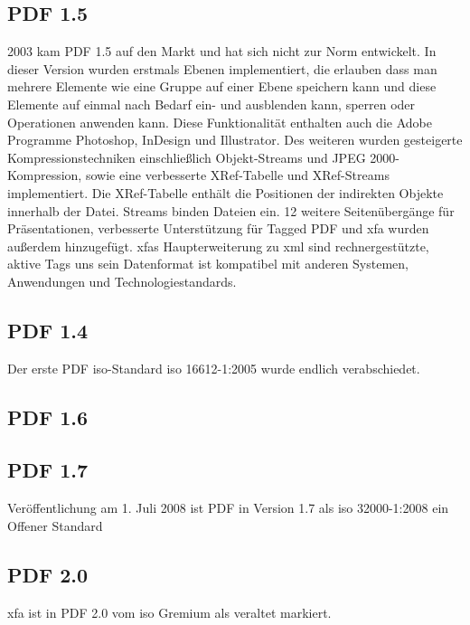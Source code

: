 \subsection{PDF 1.5}
2003 kam PDF 1.5 auf den Markt und hat sich nicht zur Norm entwickelt. In dieser Version wurden erstmals Ebenen implementiert, die erlauben dass man mehrere Elemente wie eine Gruppe auf einer Ebene speichern kann und diese Elemente auf einmal nach Bedarf ein- und ausblenden kann, sperren oder Operationen anwenden kann. Diese Funktionalität enthalten auch die Adobe Programme Photoshop, InDesign und Illustrator. Des weiteren wurden gesteigerte Kompressionstechniken einschließlich Objekt-Streams und JPEG 2000-Kompression, sowie eine verbesserte XRef-Tabelle und XRef-Streams implementiert.
Die XRef-Tabelle enthält die Positionen der indirekten Objekte innerhalb der Datei. Streams binden Dateien ein. 12 weitere Seitenübergänge für Präsentationen, verbesserte Unterstützung für Tagged PDF und \gls{xfa} wurden außerdem hinzugefügt. \cite{proj-consult} \gls{xfa}s Haupterweiterung zu \gls{xml} sind rechnergestützte, aktive Tags uns sein Datenformat ist kompatibel mit anderen Systemen, Anwendungen und Technologiestandards. \cite{wiki-xfa}

\subsection{PDF 1.4}
Der erste PDF \gls{iso}-Standard \gls{iso} 16612-1:2005 wurde endlich verabschiedet.

\subsection{PDF 1.6}

\subsection{PDF 1.7}
Veröffentlichung am 1. Juli 2008 ist PDF in Version 1.7 als \gls{iso} 32000-1:2008 ein Offener Standard

\subsection{PDF 2.0}
\gls{xfa} ist in PDF 2.0 vom \gls{iso} Gremium als veraltet markiert.